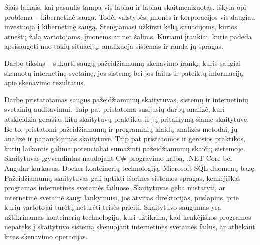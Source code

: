 Šiais laikais, kai pasaulis tampa vis labiau ir labiau skaitmenizuotas, iškyla opi problema – kibernetinė sauga. Todėl valstybės, įmonės ir korporacijos vis daugiau investuoja į kibernetinę saugą. Stengiamasi užkirsti kelią situacijoms, kurios atneštų žalą vartotojams, įmonėms ar net šalims. Kuriami įrankiai, kurie padeda apsisaugoti nuo tokių situacijų, analizuoja sistemas ir randa jų spragas.

Darbo tikslas – sukurti saugų pažeidžiamumų skenavimo įrankį, kuris saugiai skenuotų internetinę
svetainę, jos sistemą bei jos failus ir pateiktų informaciją apie skenavimo rezultatus.

Darbe pristatotamas saugus pažeidžiamumų skaitytuvas, sistemų ir internetinių svetainių auditavimui. Taip pat pristatoma susijusių darbų analizė, kuri atskleidžia gerasias kitų skaitytuvų praktikas ir jų pritaikymą šiame skaitytuve. Be to, pristatomi pažeidžiamumų ir programinių klaidų analizės metodai, jų analizė ir panaudojimas skaitytuve. Taip pat pristatomos ir gerosios praktikos, kurių laikantis galima potencialiai sumažinti pažeidžiamumų skaičių sistemoje. Skaitytuvas įgyvendintas naudojant C\# progravimo kalbą, .NET Core bei Angular karkasus, Docker konteinerių technologiją, Microsoft SQL duomenų bazę. Pažeidžiamumų skaitytuvas gali aptikti išorines sistemos spragas, kenkėjiškas programas internetinės svetainės failuose. Skaitytuvas geba nustatyti, ar internetinė svetainė saugi lankymuisi, jos atviras direktorijas, puslapius, prie kurių vartotojai turėtų neturėti teisės prieiti. Skaitytuvo saugumas yra užtikrinamas konteinerių technologija, kuri užtikrina, kad kenkėjiškos programos nepateks į skaitytuvo sistemą skenuojant internetinės svetainės failus, ar atliekant kitas skenavimo operacijas.